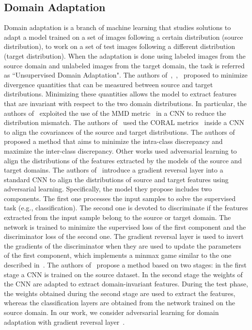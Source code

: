 \documentclass[preprint]{elsarticle}
\begin{document}
\subsection{Domain Adaptation}
Domain adaptation is a branch of machine learning that studies solutions to adapt a model trained on a set of images following a certain distribution (source distribution), to work on a set of test images following a different distribution (target distribution). When the adaptation is done using labeled images from the source domain and unlabeled images from the target domain, the task is referred as ``Unsupervised Domain Adaptation". The authors of~\cite{Rozantsev_2019},~\cite{Sun_2016},~\cite{Kang_2019} proposed to minimize divergence quantities that can be measured between source and target distributions. Minimizing these quantities allows the model to extract features that are invariant with respect to the two domain distributions. In particular, the authors of~\cite{Rozantsev_2019} exploited the use of the MMD metric~\cite{gretton2008kernel} in a CNN to reduce the distribution mismatch. The authors of~\cite{Sun_2016} used the CORAL metrics~\cite{Sun_2017} inside a CNN to align the covariances of the source and target distributions. The authors of~\cite{Kang_2019} proposed a method that aims to minimize the intra-class discrepancy and maximize the inter-class discrepancy. Other works used adversarial learning to align the distributions of the features extracted by the models of the source and target domains. The authors of~\cite{ganin2014unsupervised} introduce a gradient reversal layer into a standard CNN to align the distributions of source and target features using adversarial learning. Specifically, the model they propose includes two components. The first one processes the input samples to solve the supervised task (e.g., classification). The second one is devoted to discriminate if the features extracted from the input sample belong to the source or target domain. The network is trained to minimize the supervised loss of the first component and the discriminator loss of the second one. The gradient reversal layer is used to invert the gradients of the discriminator when they are used to update the parameters of the first component, which implements a minmax game similar to the one described in~\cite{goodfellow2014generative}. The authors of~\cite{Tzeng_2017} propose a method based on two stages: in the first stage a CNN is trained on the source dataset. In the second stage the weights of the CNN are adapted to extract domain-invariant features. During the test phase, the weights obtained during the second stage are used to extract the features, whereas the classification layers are obtained from the network trained on the source domain.
\newline
In our work, we consider adversarial learning for domain adaptation with gradient reversal layer~\cite{ganin2014unsupervised}.
\end{document}
